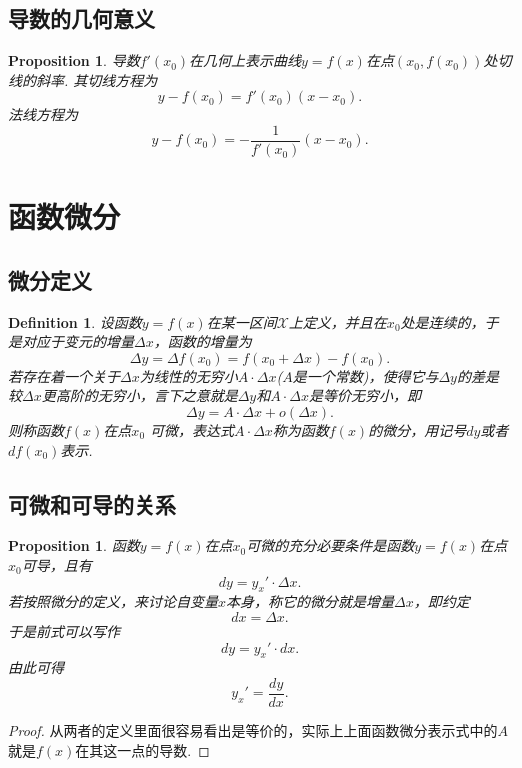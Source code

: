 \documentclass{article}
\newtheorem{proposition}[theorem]{Proposition}
\newtheorem{definition}[theorem]{Definition}
\begin{document}
\subsection{导数的几何意义}

\begin{proposition}
\rm 导数$f'(x_0)$在几何上表示曲线$y=f(x)$在点$(x_0,f(x_0))$处切线的斜率. 其切线方程为
$$
y-f(x_0) = f'(x_0)(x-x_0).
$$
法线方程为
$$
y-f(x_0) = -\frac{1}{f'(x_0)}(x-x_0).
$$
\end{proposition}



\newpage
\section{函数微分}

\subsection{微分定义}
\begin{definition}
\rm 设函数$y=f(x)$在某一区间$\mathcal{X}$上定义，并且在$x_0$处是连续的，于是对应于变元的增量$\Delta x$，函数的增量为
$$
\Delta y = \Delta f(x_0) = f(x_0 + \Delta x) - f(x_0).
$$
若{\color{red}存在着一个关于$\Delta x$为线性的无穷小$A \cdot \Delta x$($A$是一个常数)，使得它与$\Delta y$的差是较$\Delta x$更高阶的无穷小}，{\color{blue}言下之意就是$\Delta y$和$A \cdot \Delta x$是等价无穷小}，即
$$
\Delta y = A \cdot \Delta x + o(\Delta x).
$$
则称函数$f(x)$在点$x_0$ {\color{red}可微}，表达式$A \cdot \Delta x$称为函数$f(x)$的{\color{red}微分}，用记号$dy$或者$df(x_0)$表示.
\end{definition}


\subsection{可微和可导的关系}

\begin{proposition}
\rm 函数$y=f(x)$在点$x_0$可微的充分必要条件是函数$y=f(x)$在点$x_0$可导，且有
$$
dy = y_x' \cdot \Delta x.
$$
若按照微分的定义，来讨论自变量$x$本身，称它的微分就是增量$\Delta x$，即约定
$$
dx = \Delta x.
$$
于是前式可以写作
$$
dy = y_x' \cdot dx.
$$
由此可得
$$
y_x' = \frac{dy}{dx}.
$$
\end{proposition}

\begin{proof}
{\color{blue}从两者的定义里面很容易看出是等价的，实际上上面函数微分表示式中的$A$就是$f(x)$在其这一点的导数}.
\end{proof}
\end{document}
